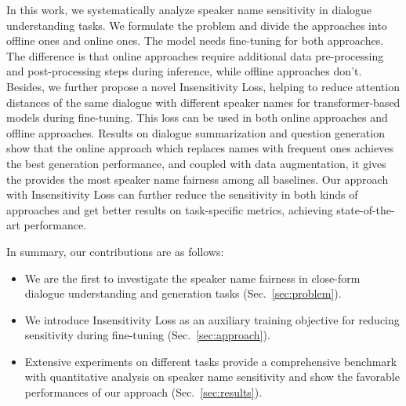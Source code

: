 In this work, we systematically analyze speaker name sensitivity in dialogue 
understanding tasks. We formulate the problem and divide the approaches 
into offline ones and online ones. The model needs fine-tuning for both 
approaches. The difference is that online approaches require additional 
data pre-processing and post-processing steps during inference, 
while offline approaches don't. 
Besides, we further propose a novel Insensitivity Loss, helping to reduce attention distances of the same dialogue with different speaker names for transformer-based models during fine-tuning. This loss can be used in both online approaches and offline approaches.
Results on dialogue summarization and question generation show that the
online approach which replaces names with frequent ones achieves the best generation performance, and coupled with data augmentation, it gives the provides
the most speaker name fairness among all baselines.
Our approach with Insensitivity Loss can further reduce the sensitivity in both kinds of approaches and get better results on task-specific metrics, achieving state-of-the-art performance.

In summary, our contributions are as follows:
\begin{itemize}
	\item We are the first to investigate the speaker name fairness 
in close-form dialogue understanding and generation tasks (Sec.~\ref{sec:problem}). %
	\item We introduce Insensitivity Loss as an auxiliary training objective for reducing sensitivity during fine-tuning (Sec.~\ref{sec:approach}).
	\item Extensive experiments on different tasks provide a comprehensive benchmark with quantitative analysis on speaker name sensitivity and show 
the favorable performances of our approach
(Sec.~\ref{sec:results}).
\end{itemize}
